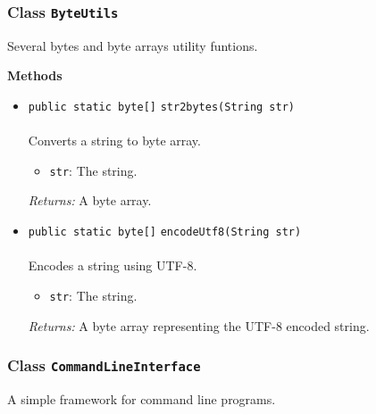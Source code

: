\subsubsection{Class \lstinline|ByteUtils|}
Several bytes and byte arrays utility funtions. \\
\noindent\begin{minipage}[t]{5cm}
\vspace{0.3em}
\hspace*{2em}
\vspace{0.3em}
\end{minipage}





\textbf{\sffamily Methods}
\begin{itemize}
\item \lstinline|public static byte[]| \lstinline|str2bytes|\lstinline|(String str)|\\ \\[-0.6em]
Converts a string to byte array.
\begin{itemize}
\item \lstinline|str|: The string.
\end{itemize}

\emph{Returns:} A byte array.

\item \lstinline|public static byte[]| \lstinline|encodeUtf8|\lstinline|(String str)|\\ \\[-0.6em]
Encodes a string using UTF-8.
\begin{itemize}
\item \lstinline|str|: The string.
\end{itemize}

\emph{Returns:} A byte array representing the UTF-8 encoded string.

\end{itemize}

\subsubsection{Class \lstinline|CommandLineInterface|}
A simple framework for command line programs. \\
\noindent\begin{minipage}[t]{5cm}
\vspace{0.3em}
\hspace*{2em}
\vspace{0.3em}
\end{minipage}




